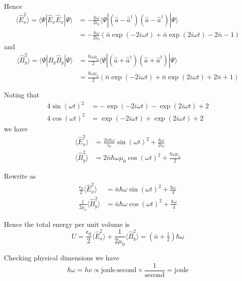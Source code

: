 \documentclass[12pt]{article}
\begin{document}
Hence
\begin{align*}
\langle\hat E_x^2\rangle
=\langle\Psi|\hat E_x\hat E_x|\Psi\rangle
&=-\frac{\hbar\omega}{2\epsilon_0}
\langle\Psi|(\hat a-\hat a^\dag)(\hat a-\hat a^\dag)|\Psi\rangle
\\
&=-\frac{\hbar\omega}{2\epsilon_0}
\left(\bar n\exp(-2i\omega t)+\bar n\exp(2i\omega t)-2\bar n-1\right)
\end{align*}
and
\begin{align*}
\langle\hat B_y^2\rangle
=\langle\Psi|\hat B_y\hat B_y|\Psi\rangle
&=\frac{\hbar\omega\mu_0}{2}
\langle\Psi|(\hat a+\hat a^\dag)(\hat a+\hat a^\dag)|\Psi\rangle
\\
&=\frac{\hbar\omega\mu_0}{2}
\left(\bar n\exp(-2i\omega t)+\bar n\exp(2i\omega t)+2\bar n+1\right)
\end{align*}

Noting that
\begin{align*}
4\sin(\omega t)^2&=-\exp(-2i\omega t)-\exp(2i\omega t)+2\\
4\cos(\omega t)^2&=\exp(-2i\omega t)+\exp(2i\omega t)+2
\end{align*}
we have
\begin{align*}
\langle\hat E_x^2\rangle
&=\frac{2\bar n\hbar\omega}{\epsilon_0}\sin(\omega t)^2+\frac{\hbar\omega}{2\epsilon_0}
\\
\langle\hat B_y^2\rangle
&=2\bar n\hbar\omega\mu_0\cos(\omega t)^2+\frac{\hbar\omega\mu_0}{2}
\end{align*}

Rewrite as
\begin{align*}
\frac{\epsilon_0}{2}\langle\hat E_x^2\rangle&=\bar n\hbar\omega\sin(\omega t)^2+\frac{\hbar\omega}{4}
\\
\frac{1}{2\mu_0}\langle\hat B_y^2\rangle&=\bar n\hbar\omega\cos(\omega t)^2+\frac{\hbar\omega}{4}
\end{align*}

Hence the total energy per unit volume is
\begin{equation*}
U=\frac{\epsilon_0}{2}\langle\hat E_x^2\rangle
+\frac{1}{2\mu_0}\langle\hat B_y^2\rangle
=\left(\bar n+\tfrac{1}{2}\right)\hbar\omega
\end{equation*}

Checking physical dimensions we have
\begin{equation*}
\hbar\omega=h\nu\propto\text{joule}\,\text{second}\times\frac{1}{\text{second}}=\text{joule}
\end{equation*}
\end{document}
